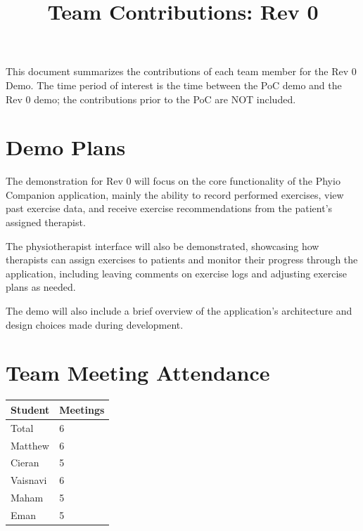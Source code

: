\documentclass{article}
\title{Team Contributions: Rev 0\\\progname}
\author{\authname}
\date{}
\begin{document}
\maketitle

This document summarizes the contributions of each team member for the Rev 0
Demo.  The time period of interest is the time between the PoC demo and the Rev
0 demo; the contributions prior to the PoC are NOT included.

\section{Demo Plans}

The demonstration for Rev 0 will focus on the core functionality of the Phyio Companion application, mainly the ability to record performed exercises, view past exercise data, and receive exercise recommendations from the patient's assigned therapist. 

The physiotherapist interface will also be demonstrated, showcasing how therapists can assign exercises to patients and monitor their progress through the application, including leaving comments on exercise logs and adjusting exercise plans as needed.

The demo will also include a brief overview of the application's architecture and design choices made during development.

\section{Team Meeting Attendance}


\begin{table}[H]
\centering
\begin{tabular}{ll}
\toprule
\textbf{Student} & \textbf{Meetings}\\
\midrule
Total & 6\\
Matthew & 6\\
Cieran & 5\\
Vaisnavi & 6\\
Maham & 5\\
Eman & 5\\
\bottomrule
\end{tabular}
\end{table}
\end{document}
